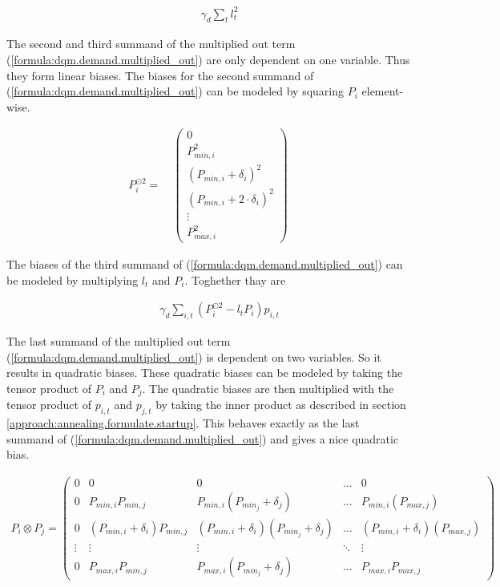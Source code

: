 \begin{align}
  \qquad
  \gamma_d \sum_t l_t^2
\end{align}

The second and third summand of the multiplied out term (\ref{formula:dqm.demand.multiplied_out}) are only dependent on one variable.
Thus they form linear biases.
The biases for the second summand of (\ref{formula:dqm.demand.multiplied_out}) can be modeled by squaring $P_i$ element-wise.

\begin{align}
  P_i^{\odot 2} = \quad \begin{pmatrix}
    0 \\
    P_{min, i}^2 \\
    \left( P_{min, i} + \delta_i \right)^2 \\
    \left( P_{min, i} + 2 \cdot \delta_i \right)^2 \\
    \vdots \\
    P_{max, i}^2
  \end{pmatrix}
\end{align}

The biases of the third summand of (\ref{formula:dqm.demand.multiplied_out}) can be modeled by multiplying $l_t$ and $P_i$.
Toghether thay are

\begin{align}
  \qquad
  \gamma_d \sum_{i, t} \left( P_i^{\odot 2} - l_t P_i \right) p_{i, t}
\end{align}

The last summand of the multiplied out term (\ref{formula:dqm.demand.multiplied_out}) is dependent on two variables.
So it results in quadratic biases.
These quadratic biases can be modeled by taking the tensor product of $P_i$ and $P_j$.
The quadratic biases are then multiplied with the tensor product of $p_{i, t}$ and $p_{j, t}$ by taking the inner product as described in section \ref{approach:annealing.formulate.startup}.
This behaves exactly as the last summand of (\ref{formula:dqm.demand.multiplied_out}) and gives a nice quadratic bias.

\begin{align}
  P_i \otimes P_j = \begin{pmatrix}
    0 & 0 & 0 & \ldots & 0 \\
    0 & P_{min, i} P_{min, j} & P_{min, i} \left( P_{min_j} + \delta_j \right) & \ldots & P_{min, i} \left( P_{max, j} \right) \\
    0 & \left( P_{min, i} + \delta_i \right) P_{min, j} & \left( P_{min, i} + \delta_i \right) \left( P_{min_j} + \delta_j \right) & \ldots & \left( P_{min, i} + \delta_i \right) \left( P_{max, j} \right) \\
    \vdots & \vdots & \vdots & \ddots & \vdots \\
    0 & P_{max, i} P_{min, j} & P_{max, i} \left( P_{min_j} + \delta_j \right) & \ldots & P_{max, i} P_{max, j}
  \end{pmatrix}
\end{align}

